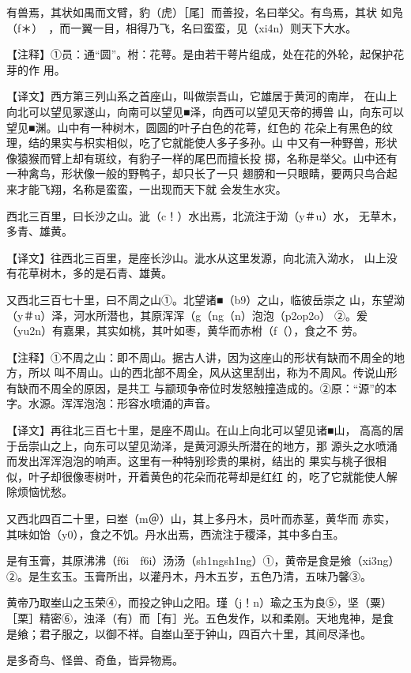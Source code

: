 \documentclass[a4paper,12pt,UTF8,twoside]{ctexbook}
\begin{document}
有兽焉，其状如禺而文臂，豹（虎）［尾］而善投，名曰举父。有鸟焉，其状 如凫（f＊）　，而一翼一目，相得乃飞，名曰蛮蛮，见（xi4n）则天下大水。

【注释】①员：通“圆”。柎：花萼。是由若干萼片组成，处在花的外轮，起保护花芽的作 用。

【译文】西方第三列山系之首座山，叫做崇吾山，它雄居于黄河的南岸， 在山上向北可以望见冢遂山，向南可以望见■泽，向西可以望见天帝的搏兽 山，向东可以望见■渊。山中有一种树木，圆圆的叶子白色的花萼，红色的 花朵上有黑色的纹理，结的果实与枳实相似，吃了它就能使人多子多孙。山 中又有一种野兽，形状像猿猴而臂上却有斑纹，有豹子一样的尾巴而擅长投 掷，名称是举父。山中还有一种禽鸟，形状像一般的野鸭子，却只长了一只 翅膀和一只眼睛，要两只鸟合起来才能飞翔，名称是蛮蛮，一出现而天下就 会发生水灾。

西北三百里，曰长沙之山。泚（c！）水出焉，北流注于泑（y＃u）水， 无草木，多青、雄黄。

【译文】往西北三百里，是座长沙山。泚水从这里发源，向北流入泑水， 山上没有花草树木，多的是石青、雄黄。

又西北三百七十里，曰不周之山①。北望诸■（b9）之山，临彼岳崇之 山，东望泑（y＃u）泽，河水所潜也，其原浑浑（g（ng（n）泡泡（p2op2o） ②。爰（yu2n）有嘉果，其实如桃，其叶如枣，黄华而赤柎（f（），食之不 劳。

【注释】①不周之山：即不周山。据古人讲，因为这座山的形状有缺而不周全的地方，所以 叫不周山。山的西北部不周全，风从这里刮出，称为不周风。传说山形有缺而不周全的原因，是共工 与颛顼争帝位时发怒触撞造成的。②原：“源”的本字。水源。浑浑泡泡：形容水喷涌的声音。

【译文】再往北三百七十里，是座不周山。在山上向北可以望见诸■山， 高高的居于岳崇山之上，向东可以望见泑泽，是黄河源头所潜在的地方，那 源头之水喷涌而发出浑浑泡泡的响声。这里有一种特别珍贵的果树，结出的 果实与桃子很相似，叶子却很像枣树叶，开着黄色的花朵而花萼却是红红 的，吃了它就能使人解除烦恼忧愁。

又西北四百二十里，曰峚（m＠）山，其上多丹木，员叶而赤茎，黄华而 赤实，其味如饴（y0），食之不饥。丹水出焉，西流注于稷泽，其中多白玉。

是有玉膏，其原沸沸（f6i　f6i）汤汤（sh1ngsh1ng）①，黄帝是食是飨（xi3ng） ②。是生玄玉。玉膏所出，以灌丹木，丹木五岁，五色乃清，五味乃馨③。

黄帝乃取峚山之玉荣④，而投之钟山之阳。瑾（j！n）瑜之玉为良⑤，坚（粟） ［栗］精密⑥，浊泽（有）而［有］光。五色发作，以和柔刚。天地鬼神，是食 是飨；君子服之，以御不祥。自峚山至于钟山，四百六十里，其间尽泽也。

是多奇鸟、怪兽、奇鱼，皆异物焉。
\end{document}
